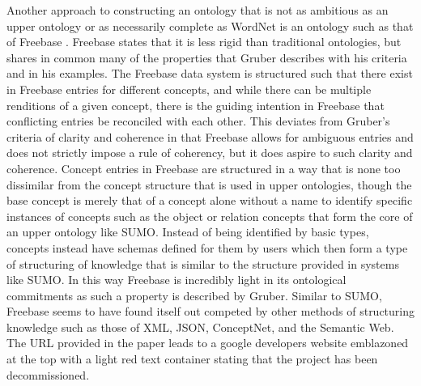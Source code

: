 \documentclass[letterpaper, 10 pt, conference]{ieeeconf}
\begin{document}
Another approach to constructing an ontology that is not as ambitious as an upper ontology or as necessarily complete as WordNet is an ontology such as that of Freebase \textcolor{gray}{\cite{Bollacker}}. Freebase states that it is less rigid than traditional ontologies, but shares in common many of the properties that Gruber describes with his criteria and in his examples. The Freebase data system is structured such that there exist in Freebase entries for different concepts, and while there can be multiple renditions of a given concept, there is the guiding intention in Freebase that conflicting entries be reconciled with each other. This deviates from Gruber's criteria of clarity and coherence in that Freebase allows for ambiguous entries and does not strictly impose a rule of coherency, but it does aspire to such clarity and coherence. Concept entries in Freebase are structured in a way that is none too dissimilar from the concept structure that is used in upper ontologies, though the base concept is merely that of a concept alone without a name to identify specific instances of concepts such as the object or relation concepts that form the core of an upper ontology like SUMO. Instead of being identified by basic types, concepts instead have schemas defined for them by users which then form a type of structuring of knowledge that is similar to the structure provided in systems like SUMO. In this way Freebase is incredibly light in its ontological commitments as such a property is described by Gruber. Similar to SUMO, Freebase seems to have found itself out competed by other methods of structuring knowledge such as those of XML, JSON, ConceptNet, and the Semantic Web. The URL provided in the paper leads to a google developers website emblazoned at the top with a light red text container stating that the project has been decommissioned.
\end{document}
